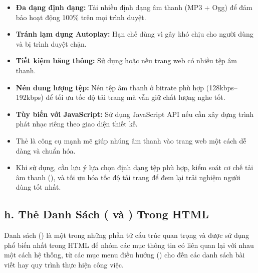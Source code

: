 \begin{warnBox}
\begin{itemize}[leftmargin=1.5em, itemsep=3pt, parsep=0pt]
    \item \textbf{Đa dạng định dạng:} Tải nhiều định dạng âm thanh (MP3 + Ogg) để đảm bảo hoạt động 100\% trên mọi trình duyệt.
    \item \textbf{Tránh lạm dụng Autoplay:} Hạn chế dùng  vì gây khó chịu cho người dùng và bị trình duyệt chặn.
    \item \textbf{Tiết kiệm băng thông:} Sử dụng  hoặc  nếu trang web có nhiều tệp âm thanh.
    \item \textbf{Nén dung lượng tệp:} Nén tệp âm thanh ở bitrate phù hợp (128kbps--192kbps) để tối ưu tốc độ tải trang mà vẫn giữ chất lượng nghe tốt.
    \item \textbf{Tùy biến với JavaScript:} Sử dụng JavaScript API nếu cần xây dựng trình phát nhạc riêng theo giao diện thiết kế.
\end{itemize}
\end{warnBox}

\begin{conceptBox}
\begin{itemize}[leftmargin=1.5em, itemsep=3pt, parsep=0pt]
    \item Thẻ  là công cụ mạnh mẽ giúp nhúng âm thanh vào trang web một cách dễ dàng và chuẩn hóa.
    \item Khi sử dụng, cần lưu ý lựa chọn định dạng tệp phù hợp, kiểm soát cơ chế tải âm thanh (), và tối ưu hóa tốc độ tải trang để đem lại trải nghiệm người dùng tốt nhất.
\end{itemize}
\end{conceptBox}

\subsection{h. Thẻ Danh Sách ( và ) Trong HTML}

Danh sách () là một trong những phần tử cấu trúc quan trọng và được sử dụng phổ biến nhất trong HTML để nhóm các mục thông tin có liên quan lại với nhau một cách hệ thống, từ các mục menu điều hướng () cho đến các danh sách bài viết hay quy trình thực hiện công việc.

